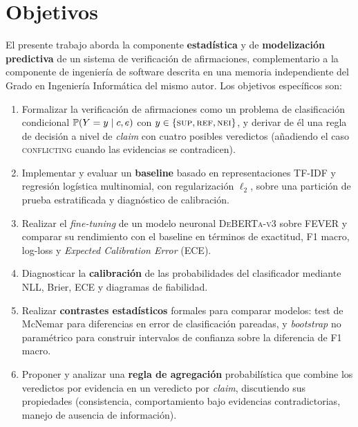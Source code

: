 \section{Objetivos}

El presente trabajo aborda la componente \textbf{estadística} y de
\textbf{modelización predictiva} de un sistema de verificación de
afirmaciones, complementario a la componente de ingeniería de software
descrita en una memoria independiente del Grado en Ingeniería Informática
del mismo autor. Los objetivos específicos son:

\begin{enumerate}[leftmargin=*,itemsep=0.2em]
  \item Formalizar la verificación de afirmaciones como un problema de
        clasificación condicional $\mathbb{P}(Y = y \mid c, e)$ con
        $y \in \{\textsc{sup}, \textsc{ref}, \textsc{nei}\}$, y derivar
        de él una regla de decisión a nivel de \emph{claim} con cuatro
        posibles veredictos (añadiendo el caso \textsc{conflicting}
        cuando las evidencias se contradicen).
  \item Implementar y evaluar un \textbf{baseline} basado en
        representaciones TF-IDF y regresión logística multinomial, con
        regularización $\ell_2$, sobre una partición de prueba
        estratificada y diagnóstico de calibración.
  \item Realizar el \emph{fine-tuning} de un modelo neuronal
        \textsc{DeBERTa-v3} sobre FEVER y comparar su rendimiento con el
        baseline en términos de exactitud, F1 macro, log-loss y
        \emph{Expected Calibration Error} (ECE).
  \item Diagnosticar la \textbf{calibración} de las probabilidades del
        clasificador mediante NLL, Brier, ECE y diagramas de fiabilidad.
  \item Realizar \textbf{contrastes estadísticos} formales para comparar
        modelos: test de McNemar para diferencias en error de
        clasificación pareadas, y \emph{bootstrap} no paramétrico para
        construir intervalos de confianza sobre la diferencia de F1
        macro.
  \item Proponer y analizar una \textbf{regla de agregación} probabilística
        que combine los veredictos por evidencia en un veredicto por
        \emph{claim}, discutiendo sus propiedades (consistencia,
        comportamiento bajo evidencias contradictorias, manejo de
        ausencia de información).
\end{enumerate}

